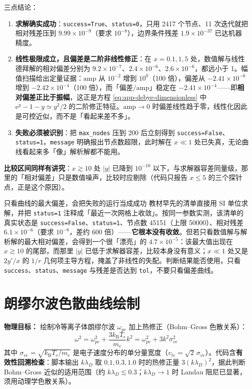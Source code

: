 \documentclass[12pt,a4paper,openany,oneside]{book}
\newcommand{\ee}{\mathrm{e}}
\begin{document}
三点结论：
\begin{enumerate}
    \item \textbf{求解确实成功}：\texttt{success=True}、\texttt{status=0}，只用 2417 个节点、11 次迭代就把相对残差压到 $9.99\times10^{-9}$（要求 $10^{-8}$），边界条件残差 $1.9\times10^{-37}$ 已达机器精度。
    \item \textbf{线性极限成立，且偏差是二阶非线性修正}：在 $x=0.1,1,5$ 处，数值解与线性德拜解的相对偏差分别为 $9.2\times10^{-7}$、$2.4\times10^{-6}$、$2.6\times10^{-6}$，都远小于 1。幅值扫描给出定量证据：$\mathrm{amp}$ 从 $10^{-2}$ 增到 $10^{0}$（100 倍），偏差从 $-2.41\times10^{-6}$ 增到 $-2.42\times10^{-4}$（100 倍），而「偏差$/\mathrm{amp}$」稳定在 $-2.41\times10^{-4}$——即\textbf{相对偏差正比于振幅}，这正是方程 \eqref{eq:app-debye-dimensionless} 中 $\ee^{y}-1-y\simeq y^{2}/2$ 的二阶修正特征。$\mathrm{amp}\to0$ 时偏差线性趋于零，线性化因此是可控近似，而不是「看起来差不多」。
    \item \textbf{失败必须被识别}：把 \texttt{max\_nodes} 压到 200 后立刻得到 \texttt{success=False}、\texttt{status=1}，\texttt{message} 明确报出节点数超限，此时解在 $x\ll1$ 处已失真，无论曲线看起来多「像」解析解都不能用。
\end{enumerate}

\textbf{比较区间同样有讲究}：$x\gtrsim10$ 处 $|y|$ 已降到 $10^{-10}$ 以下，与求解器容差同量级，那里的「相对偏差」只是数值噪声，比较时应剔除（代码只报告 $x\le5$ 的三个探针点，正是这个原因）。

\begin{warning}{只看曲线的最大偏差，会把失败的运行当成成功}{}
教材早先的清单直接用 SI 单位求解，并把 \texttt{status=1} 注释成「最近一次网格上收敛」。按同一参数实测，该清单的真实状态是 \texttt{success=False}、\texttt{status=1}、节点数 45151（上限 50000）、相对残差 $6.1\times10^{-6}$（要求 $10^{-8}$，差约 600 倍）——\textbf{它根本没有收敛}。但若只看数值解与解析解的最大相对偏差，会得到一个很「漂亮」的 $4.7\times10^{-5}$：该最大值出现在 $x\gtrsim10$ 的尾部，而那里 $|y|$ 已低于求解器容差，比较本身没有意义；$x\ll1$ 处又是 $2y'/x$ 的 $1/r$ 几何项主导方程，掩盖了非线性的失配。判断结果能否使用，只看 \texttt{success}、\texttt{status}、\texttt{message} 与残差是否达到 \texttt{tol}，不要只看偏差曲线。
\end{warning}


\section{朗缪尔波色散曲线绘制}

\textbf{物理目标：} 绘制冷等离子体朗缪尔波 $\omega_{pe}$ 加上热修正（Bohm--Gross 色散关系）：
\begin{equation}
\omega^2 = \omega_{pe}^2 + \frac{3k_\mathrm{B}T_e}{m_e}k^2 = \omega_{pe}^2 + 3k^2\sigma_{ve}^2
\end{equation}
其中 $\sigma_{ve}=\sqrt{k_\mathrm{B}T_e/m_e}$ 是电子速度分布的单分量宽度（$v_{te}=\sqrt2\,\sigma_{ve}$）。代码含\textbf{有效性回溯检查}：脚本输出 $k\lambda_D$ 取 $0.1,0.3,1.0$ 时的热修正量 $3(k\lambda_D)^2$，据此判断 Bohm--Gross 近似的适用范围（约 $k\lambda_D\lesssim0.3$；$k\lambda_D\to1$ 时 Landau 阻尼已显著，须用动理学色散关系）。
\end{document}
